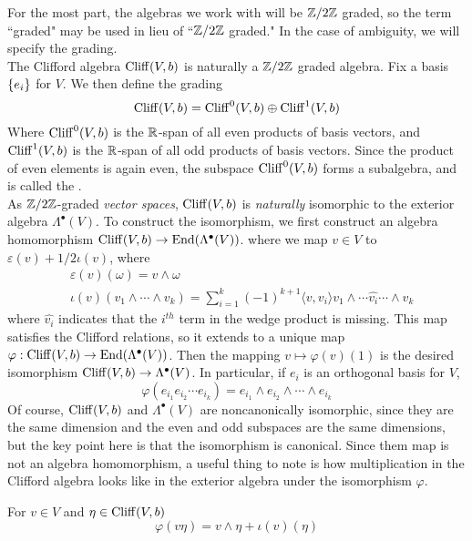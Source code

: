 %
For the most part, the algebras we work with will be $\mathbb{Z}/2\mathbb{Z}$ graded, so
the term ``graded" may be used in lieu of ``$\mathbb{Z}/2\mathbb{Z}$ graded." In the case of
ambiguity, we will specify the grading. \\
The Clifford algebra $\operatorname{Cliff}(V,b)$ is naturally a $\mathbb{Z}/2\mathbb{Z}$ graded algebra. Fix
a basis $\left\lbrace e_i \right\rbrace$ for $V$. We then define the grading
\[
\operatorname{Cliff}(V,b) = \operatorname{Cliff}^0(V,b) \oplus \operatorname{Cliff}^1(V,b)
\]
Where $\operatorname{Cliff}^0(V,b)$ is the $\mathbb{R}$-span of all even products of basis vectors,
and $\operatorname{Cliff}^1(V,b)$ is the $\mathbb{R}$-span of all odd products of basis vectors.
Since the product of even elements is again even, the subspace
$\operatorname{Cliff}^0(V,b)$ forms a subalgebra, and is called the . \\

As $\mathbb{Z}/2\mathbb{Z}$-graded \emph{vector spaces}, $\operatorname{Cliff}(V,b)$ is \emph{naturally}
isomorphic to the exterior algebra $\Lambda^\bullet(V)$. To construct the isomorphism,
we first construct an algebra homomorphism $\operatorname{Cliff}(V,b) \to \operatorname{End}(\Lambda^\bullet(V))$.
where we map $v \in V$
to $\varepsilon(v) + 1/2 \iota(v)$, where
\begin{align*}
&\varepsilon(v)(\omega) = v \wedge \omega \\
&\iota(v)(v_1 \wedge\cdots\wedge v_k)
= \sum_{i = 1}^k (-1)^{k+1}
\langle v,v_i\rangle v_1 \wedge \cdots \widehat{v_i} \cdots \wedge v_k
\end{align*}
where $\widehat{v_i}$ indicates that the $i^{th}$ term in the wedge product is missing.
This map satisfies the Clifford relations, so it extends to a unique map
$\varphi : \operatorname{Cliff}(V,b) \to \operatorname{End}(\Lambda^\bullet(V))$. Then the mapping
$v \mapsto \varphi(v)(1)$ is the desired isomorphism
$\operatorname{Cliff}(V,b) \to \Lambda^\bullet(V)$. In particular, if $e_i$ is an orthogonal basis
for $V$,
\[
\varphi(e_{i_1}e_{i_2}\cdots e_{i_k}) = e_{i_1}\wedge e_{i_2}\wedge\cdots\wedge e_{i_k}
\]
Of course, $\operatorname{Cliff}(V,b)$ and
$\Lambda^\bullet(V)$ are noncanonically isomorphic, since they are the same dimension
and the even and odd subspaces are the same dimensions, but the key point here is that
the isomorphism is canonical. Since them map is not an algebra homomorphism, a useful
thing to note is how multiplication in the Clifford algebra looks like in the exterior
algebra under the isomorphism $\varphi$.
%
\begin{prop}
For $v \in V$ and $\eta \in \operatorname{Cliff}(V,b)$
\[
\varphi(v\eta) = v \wedge \eta + \iota(v)(\eta)
\]
\end{prop}
%
